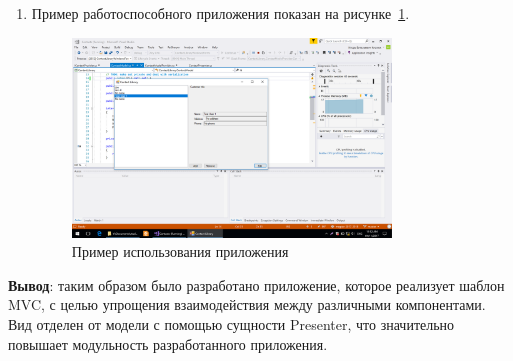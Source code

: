 \documentclass[14pt,a4paper]{extreport}
\begin{document}
\begin{enumerate}
\item Пример работоспособного приложения показан на рисунке~\ref{working-app}.

\begin{figure}[ht]
\centering
\includegraphics[width=0.8\textwidth]{../screenshots/Screenshot_3}
\caption{Пример использования приложения}
\label{working-app}
\end{figure}

\end{enumerate}

\clearpage

\textbf{Вывод}: таким образом было разработано приложение, которое реализует шаблон MVC, с целью упрощения взаимодействия между различными компонентами. Вид отделен от модели с помощью сущности Presenter, что значительно повышает модульность разработанного приложения.
\end{document}
